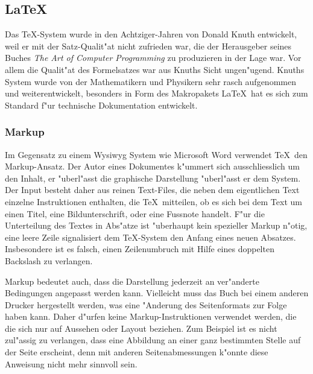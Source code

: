 \documentclass[a4paper,12pt]{article}
\begin{document}
\subsection{\LaTeX}
Das \TeX-System wurde in den Achtziger-Jahren von Donald Knuth entwickelt,
weil er mit der Satz-Qualit"at nicht zufrieden war, die der Herausgeber
seines Buches {\em The Art of Computer Programming} zu produzieren in
der Lage war.
Vor allem die Qualit"at des Formelsatzes war aus Knuths Sicht 
ungen"ugend.
Knuths System wurde von der Mathematikern und Physikern sehr rasch
aufgenommen und weiterentwickelt, besonders in Form des Makropakets
\LaTeX\ hat es sich zum Standard f"ur technische Dokumentation
entwickelt.

\subsubsection{Markup}
Im Gegensatz zu einem Wysiwyg System wie Microsoft Word verwendet
\TeX\ den Markup-Ansatz.
Der Autor eines Dokumentes k"ummert sich ausschliesslich um den Inhalt,
er "uberl"asst die graphische Darstellung "uberl"asst er dem System.
Der Input besteht daher aus reinen Text-Files, die neben dem eigentlichen
Text einzelne Instruktionen enthalten, die \TeX\ mitteilen, ob es sich
bei dem Text um einen Titel, eine Bildunterschrift, oder eine Fussnote
handelt.
F"ur die Unterteilung des Textes in Abs"atze ist "uberhaupt
kein spezieller Markup n"otig, eine leere Zeile signalisiert
dem \TeX-System den Anfang eines neuen Absatzes.
Insbesondere ist es falsch, einen Zeilenumbruch mit Hilfe eines
doppelten Backslash zu verlangen.

Markup bedeutet auch, dass die Darstellung jederzeit an ver"anderte
Bedingungen angepasst werden kann.
Vielleicht muss das Buch bei einem anderen Drucker hergestellt
werden, was eine "Anderung des Seitenformats zur Folge haben kann.
Daher d"urfen keine Markup-Instruktionen verwendet werden, die die
sich nur auf Aussehen oder Layout beziehen.
Zum Beispiel ist es nicht zul"assig zu verlangen, dass eine Abbildung
an einer ganz bestimmten Stelle auf der Seite erscheint, denn mit
anderen Seitenabmessungen k"onnte diese Anweisung nicht mehr sinnvoll
sein.

\end{document}
